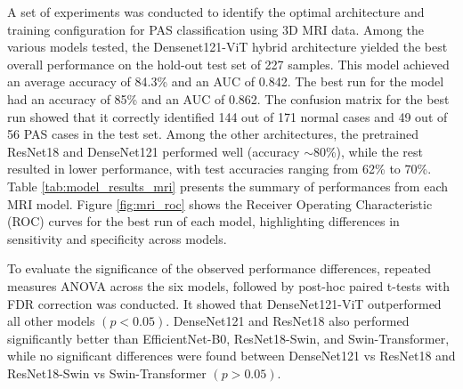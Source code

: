 \documentclass[12pt]{article}
\begin{document}
A set of experiments was conducted to identify the optimal architecture and training configuration for PAS classification using 3D MRI data. Among the various models tested, the Densenet121-ViT hybrid architecture yielded the best overall performance on the hold-out test set of 227 samples. This model achieved an average accuracy of 84.3\% and an AUC of 0.842. The best run for the model had an accuracy of 85\% and an AUC of 0.862. The confusion matrix for the best run showed that it correctly identified 144 out of 171 normal cases and 49 out of 56 PAS cases in the test set. Among the other architectures, the pretrained ResNet18 and DenseNet121 performed well (accuracy $\sim$80\%), while the rest resulted in lower performance, with test accuracies ranging from 62\% to 70\%. Table \ref{tab:model_results_mri} presents the summary of performances from each MRI model. Figure \ref{fig:mri_roc} shows the Receiver Operating Characteristic (ROC) curves for the best run of each model, highlighting differences in sensitivity and specificity across models.

To evaluate the significance of the observed performance differences, repeated measures ANOVA across the six models, followed by post-hoc paired t-tests with FDR correction was conducted. It showed that DenseNet121-ViT outperformed all other models $(p < 0.05)$. DenseNet121 and ResNet18 also performed significantly better than EfficientNet-B0, ResNet18-Swin, and Swin-Transformer, while no significant differences were found between DenseNet121 vs ResNet18 and ResNet18-Swin vs Swin-Transformer $(p > 0.05)$.
\end{document}
